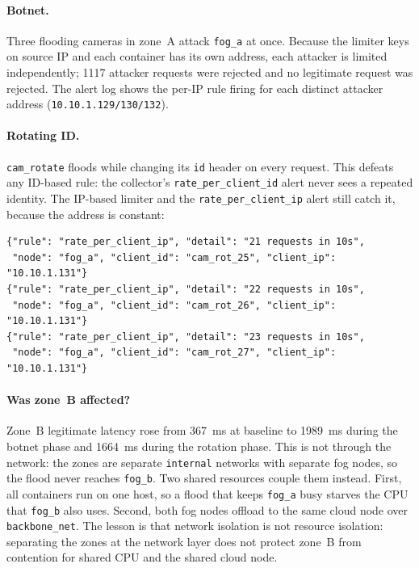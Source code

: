 \paragraph{Botnet.} Three flooding cameras in zone~A attack \texttt{fog\_a}
at once. Because the limiter keys on source IP and each container has its
own address, each attacker is limited independently; 1117 attacker requests
were rejected and no legitimate request was rejected. The alert log shows
the per-IP rule firing for each distinct attacker address
(\texttt{10.10.1.129/130/132}).

\paragraph{Rotating ID.} \texttt{cam\_rotate} floods while changing its
\texttt{id} header on every request. This defeats any ID-based rule: the
collector's \texttt{rate\_per\_client\_id} alert never sees a repeated
identity. The IP-based limiter and the \texttt{rate\_per\_client\_ip} alert
still catch it, because the address is constant:

\begin{lstlisting}[caption={Rotating attacker: changing id, one address, caught by the per-IP rule (results/rotate\_alerts.jsonl)}]
{"rule": "rate_per_client_ip", "detail": "21 requests in 10s",
 "node": "fog_a", "client_id": "cam_rot_25", "client_ip": "10.10.1.131"}
{"rule": "rate_per_client_ip", "detail": "22 requests in 10s",
 "node": "fog_a", "client_id": "cam_rot_26", "client_ip": "10.10.1.131"}
{"rule": "rate_per_client_ip", "detail": "23 requests in 10s",
 "node": "fog_a", "client_id": "cam_rot_27", "client_ip": "10.10.1.131"}
\end{lstlisting}

\paragraph{Was zone~B affected?} Zone~B legitimate latency rose from
367~ms at baseline to 1989~ms during the botnet phase and 1664~ms during
the rotation phase. This is not through the network: the zones are separate
\texttt{internal} networks with separate fog nodes, so the flood never
reaches \texttt{fog\_b}. Two shared resources couple them instead. First,
all containers run on one host, so a flood that keeps \texttt{fog\_a} busy
starves the CPU that \texttt{fog\_b} also uses. Second, both fog nodes
offload to the same cloud node over \texttt{backbone\_net}. The lesson is
that network isolation is not resource isolation: separating the zones at
the network layer does not protect zone~B from contention for shared CPU
and the shared cloud node.

